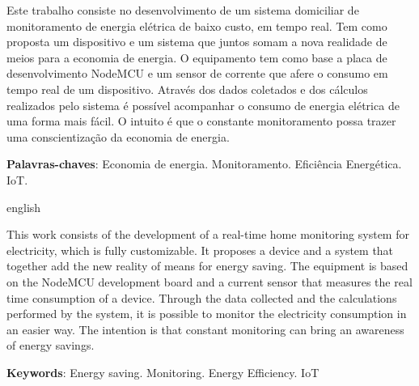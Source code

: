 \setlength{\absparsep}{18pt} %
\begin{resumo}

Este trabalho consiste no desenvolvimento de um sistema domiciliar de monitoramento de energia elétrica de baixo custo, em tempo real.
Tem como proposta um dispositivo e um sistema que juntos somam a nova realidade de meios para a economia de energia.
O equipamento tem como base a placa de desenvolvimento NodeMCU e um sensor de corrente que afere o consumo em tempo real de um dispositivo. Através
dos dados coletados e dos cálculos realizados pelo sistema é possível acompanhar o consumo de energia elétrica de uma forma mais fácil.
O intuito é que o constante monitoramento possa trazer uma conscientização da economia de energia.
 
 \noindent
 \textbf{Palavras-chaves}: Economia de energia. Monitoramento. Eficiência Energética. IoT. 
\end{resumo}
\begin{resumo}[Abstract]
	\begin{otherlanguage*}{english}	
	
	
This work consists of the development of a real-time home monitoring system for electricity, which is fully customizable.
It proposes a device and a system that together add the new reality of means for energy saving.
The equipment is based on the NodeMCU development board and a current sensor that measures the real time consumption of a device. Through
the data collected and the calculations performed by the system, it is possible to monitor the electricity consumption in an easier way.
The intention is that constant monitoring can bring an awareness of energy savings.
	
	\vspace{\onelineskip}
	\noindent 
	\textbf{Keywords}: Energy saving. Monitoring. Energy Efficiency. IoT
	\end{otherlanguage*}
\end{resumo}